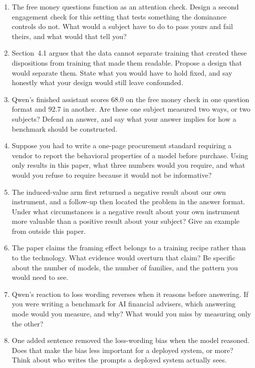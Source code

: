 \documentclass[11pt]{article}
\begin{document}
\begin{enumerate}[label=\arabic*.]
  \item The free money questions function as an attention check. Design a second engagement check
  for this setting that tests something the dominance controls do not. What would a subject have
  to do to pass yours and fail theirs, and what would that tell you?

  \item Section~4.1 argues that the data cannot separate training that created these dispositions
  from training that made them readable. Propose a design that would separate them. State what
  you would have to hold fixed, and say honestly what your design would still leave confounded.

  \item Qwen's finished assistant scores 68.0 on the free money check in one question format and
  92.7 in another. Are these one subject measured two ways, or two subjects? Defend an answer, and
  say what your answer implies for how a benchmark should be constructed.

  \item Suppose you had to write a one-page procurement standard requiring a vendor to report the
  behavioral properties of a model before purchase. Using only results in this paper, what three
  numbers would you require, and what would you refuse to require because it would not be
  informative?

  \item The induced-value arm first returned a negative result about our own instrument, and a
  follow-up then located the problem in the answer format. Under what circumstances is a negative
  result about your own instrument more valuable than a positive result about your subject? Give
  an example from outside this paper.

  \item The paper claims the framing effect belongs to a training recipe rather than to the
  technology. What evidence would overturn that claim? Be specific about the number of models,
  the number of families, and the pattern you would need to see.

  \item Qwen's reaction to loss wording reverses when it reasons before answering. If you were
  writing a benchmark for AI financial advisers, which answering mode would you measure, and why?
  What would you miss by measuring only the other?

  \item One added sentence removed the loss-wording bias when the model reasoned. Does that make the
  bias less important for a deployed system, or more? Think about who writes the prompts a deployed
  system actually sees.
\end{enumerate}
\end{document}
